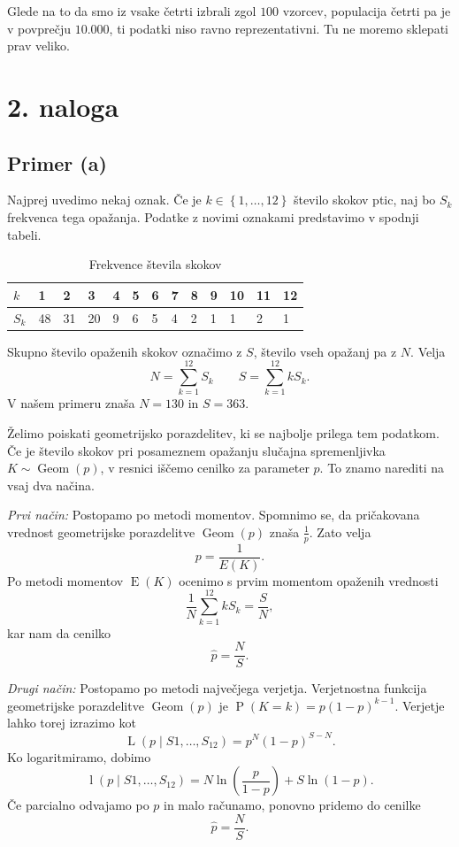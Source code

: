 \documentclass[a4paper,11pt]{article}
\newcommand{\set}[1]{\left\{#1\right\}} %
\DeclareMathOperator{\E}{E}
\DeclareMathOperator{\PP}{P}
\DeclareMathOperator{\Geom}{Geom}
\DeclareMathOperator{\Lver}{L}
\DeclareMathOperator{\lver}{l}
\begin{document}
Glede na to da smo iz vsake četrti izbrali zgol $100$ vzorcev, populacija četrti pa je v povprečju $10.000$, ti podatki niso ravno reprezentativni.
Tu ne moremo sklepati prav veliko.





\section*{2. naloga}

\subsection*{Primer (a)}

Najprej uvedimo nekaj oznak. 
Če je $k \in \set{1, \ldots, 12}$ število skokov ptic, naj bo $S_k$ frekvenca tega opažanja.
Podatke z novimi oznakami predstavimo v spodnji tabeli.
\begin{table}[H]
    \centering
    \begin{tabular}{|l|l|l|l|l|l|l|l|l|l|l|l|l|}
    \hline
    $k$ & 1 & 2 & 3 & 4 & 5 & 6 & 7 & 8 & 9 & 10 & 11 & 12 \\ \hline
    $S_k$ & 48 & 31 & 20 & 9 & 6 & 5 & 4 & 2 & 1 & 1 & 2 & 1 \\ \hline
    \end{tabular}
    \caption{Frekvence števila skokov}
    \label{freq}
\end{table}
Skupno število opaženih skokov označimo z $S$, število vseh opažanj pa z $N$.
Velja
\[N = \sum_{k=1}^{12} S_k \qquad S = \sum_{k=1}^{12} k S_k.\]
V našem primeru znaša $N = 130$ in $S = 363$.

Želimo poiskati geometrijsko porazdelitev, ki se najbolje prilega tem podatkom. 
Če je število skokov pri posameznem opažanju slučajna spremenljivka $K \sim \Geom(p)$, 
v resnici iščemo cenilko za parameter $p$.
To znamo narediti na vsaj dva načina.

\emph{Prvi način:} Postopamo po metodi momentov. 
Spomnimo se, da pričakovana vrednost geometrijske porazdelitve $\Geom(p)$ znaša $\frac{1}{p}$.
Zato velja
\[p = \frac{1}{E(K)}.\]
Po metodi momentov $\E(K)$ ocenimo s prvim momentom opaženih vrednosti 
\[\frac{1}{N} \sum_{k=1}^{12} k S_k = \frac{S}{N},\]
kar nam da cenilko
\[\hat{p} = \frac{N}{S}.\]

\emph{Drugi način:} Postopamo po metodi največjega verjetja.
Verjetnostna funkcija geometrijske porazdelitve $\Geom(p)$ je $\PP(K=k) = p(1-p)^{k-1}$.
Verjetje lahko torej izrazimo kot 
\[\Lver(p \mid S1, \ldots, S_{12}) = p^N (1-p)^{S - N}.\]
Ko logaritmiramo, dobimo 
\[\lver(p \mid S1, \ldots, S_{12}) = N \ln(\frac{p}{1-p}) + S \ln(1-p).\]
Če parcialno odvajamo po $p$ in malo računamo, ponovno pridemo do cenilke
\[\hat{p} = \frac{N}{S}.\]
\end{document}
